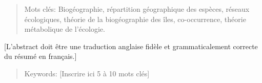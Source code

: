 
\resume
\begin{singlespace}


\begin{quote}
    Mots clés: Biogéographie, répartition géographique des espèces, réseaux écologiques,
    théorie de la biogéographie des îles, co-occurrence, théorie métabolique de l'écologie.
\end{quote}
\end{singlespace}
\cleardoublepage


\abstract
\begin{singlespace}


  [L'abstract doit être une traduction anglaise fidèle et grammaticalement correcte du résumé en français.]

  \begin{quote}
    Keywords: [Inscrire ici 5 à 10 mots clés]
  \end{quote}
\end{singlespace}
\cleardoublepage





\tabledesmatieres




\listedestableaux


